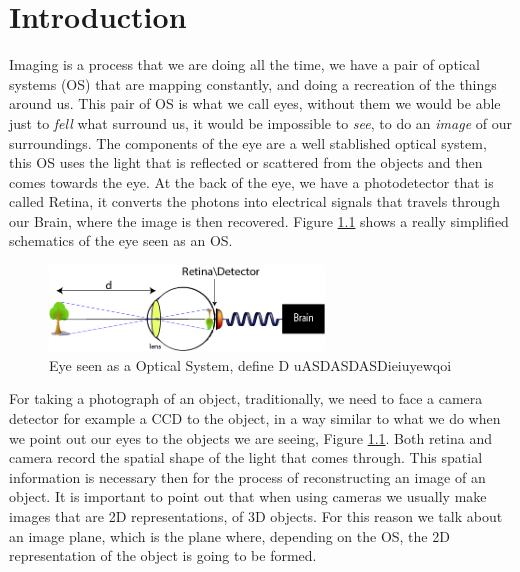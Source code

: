
\chapter{Introduction} %

\label{Chapter1} %

Imaging is a process that we are doing all the time, we have a pair of optical systems (OS) that are mapping
constantly, and doing a recreation of the things around us. This pair of OS is what we call eyes, 
without them we would be able just to \textit{fell} what surround us, it would be impossible to \textit{see}, to do an
\textit{image} of our surroundings. The components of the eye are a well stablished optical system, this OS 
uses the light that is reflected or scattered from the objects and then comes towards the eye. At the
back of the eye, we have a photodetector that is called Retina, it converts the photons into electrical
signals that travels through our Brain, where the image is then recovered. Figure \ref{fig:eye} shows a really 
simplified schematics of the eye seen as an OS.

\begin{figure}[h!]
\centering
 \includegraphics[width=0.65\textwidth]{Figures/eye.png}
 \caption{Eye seen as a Optical System, define D uASDASDASDieiuyewqoi} 
\label{fig:eye}
\end{figure}


For taking a photograph of an object, traditionally, we need to face a camera detector for example a CCD to the object, 
in a way similar to what we do when we point out our eyes to the objects we are seeing, Figure \ref{fig:eye}.
Both retina and camera record the spatial shape of the light that comes through.
This spatial information is necessary then for the process of reconstructing an image of an object. 
It is important to point out that when using cameras we usually make images that are 2D representations, of 3D objects. For this
reason we talk about an image plane, which is the plane where, depending on the OS, the 2D representation
of the object is going to be formed. 


